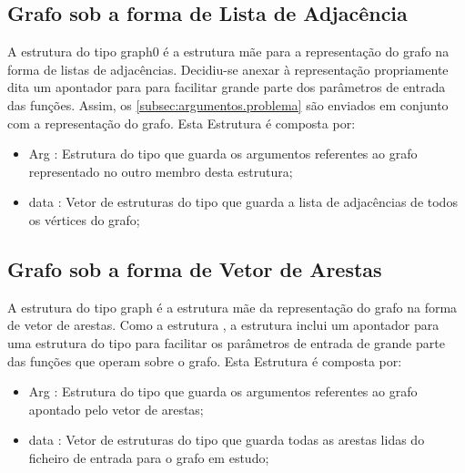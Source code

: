 \documentclass[14pt]{article}
\begin{document}
    \subsection[graph0]{Grafo sob a forma de Lista de Adjacência}\label{subsec:grafo.l.adj}
    A estrutura do tipo graph0 é a estrutura mãe para a representação do grafo na forma de listas de adjacências.
    Decidiu-se anexar à representação propriamente dita um apontador para  para
    facilitar grande parte dos parâmetros de entrada das funções.
    Assim, os \ref{subsec:argumentos.problema} são enviados em conjunto com a representação do grafo.
    Esta Estrutura é composta por:
    \begin{itemize}
        \item Arg : Estrutura do tipo  que guarda os argumentos referentes ao grafo
        representado no outro membro desta estrutura;
        \item data : Vetor de estruturas do tipo  que guarda a lista de adjacências de todos os
        vértices do grafo;
    \end{itemize}

    \subsection[graph]{Grafo sob a forma de Vetor de Arestas}\label{subsec:grafo.v.are}
    A estrutura do tipo graph é a estrutura mãe da representação do grafo na forma de vetor de arestas.
    Como a estrutura , a estrutura  inclui um apontador para uma estrutura
    do tipo  para facilitar os parâmetros de entrada de grande parte das funções que operam
    sobre o grafo.
    Esta Estrutura é composta por:
    \begin{itemize}
        \item Arg : Estrutura do tipo  que guarda os argumentos referentes ao grafo apontado pelo vetor de arestas;
        \item data : Vetor de estruturas do tipo  que guarda todas as arestas lidas do ficheiro de entrada para o grafo em estudo;
    \end{itemize}
\end{document}
